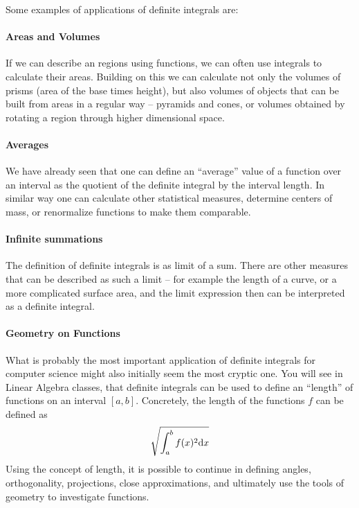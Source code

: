 Some examples of applications of definite integrals are:
\paragraph{Areas and Volumes}
If we can describe an regions using functions, we can often use integrals to calculate their areas. Building on this we can calculate not
only the volumes of prisms (area of the base times height), but also volumes of objects that can be built from areas in a regular way --
pyramids and cones, or volumes obtained by rotating a region through higher dimensional space.
\paragraph{Averages}
We have already seen that one can define an ``average'' value of a function over an interval as the quotient of the definite integral by
the interval length. In similar way one can calculate other statistical measures, determine centers of mass, or renormalize functions to
make them comparable.
\paragraph{Infinite summations}
The definition of definite integrals is as limit of a sum. There are other measures that can be described as such a limit -- for example
the length of a curve, or a more complicated surface area, and the limit expression then can be interpreted as a definite integral.
\paragraph{Geometry on Functions}
What is probably the most important application of definite integrals for
computer science might also initially seem the most cryptic one. You will see
in Linear Algebra classes, that definite integrals can be used to define an
``length'' of functions on an interval $[a,b]$. Concretely, the length of
the functions $f$ can be defined as
\[
\sqrt{
\int_a^b f(x)^2{\mbox{d}}x}
\]
Using the concept of length, it is possible to continue in defining angles,
orthogonality, projections, close approximations, and ultimately use the
tools of geometry to investigate functions.


